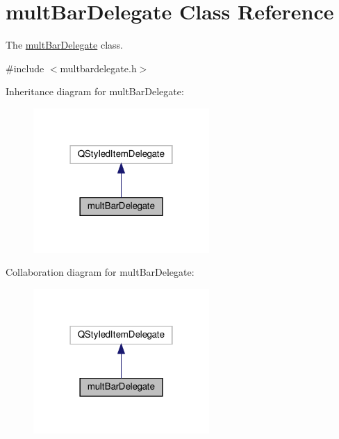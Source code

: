 \hypertarget{classmult_bar_delegate}{}\section{mult\+Bar\+Delegate Class Reference}
\label{classmult_bar_delegate}


The \mbox{\hyperlink{classmult_bar_delegate}{mult\+Bar\+Delegate}} class.  




{\ttfamily \#include $<$multbardelegate.\+h$>$}



Inheritance diagram for mult\+Bar\+Delegate\+:\nopagebreak
\begin{figure}[H]
\begin{center}
\leavevmode
\includegraphics[width=190pt]{classmult_bar_delegate__inherit__graph}
\end{center}
\end{figure}


Collaboration diagram for mult\+Bar\+Delegate\+:\nopagebreak
\begin{figure}[H]
\begin{center}
\leavevmode
\includegraphics[width=190pt]{classmult_bar_delegate__coll__graph}
\end{center}
\end{figure}
